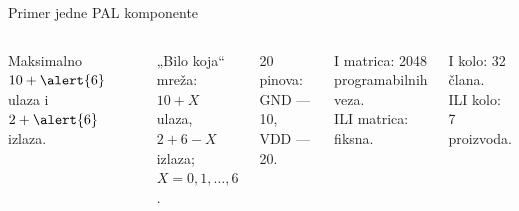 \begin{frame}[label=07-s007]{Primer jedne PAL komponente}
\begin{columns}[c,onlytextwidth]
\centering
{}\fontsize{10}{11}\selectfont
Maksimalno $10+\alert{6}$ ulaza i $2+\alert{6}$ izlaza.\par\vspace{2mm}
„Bilo koja“ mreža:\\$10+X$ ulaza,\\$2+6-X$ izlaza;\\$X=0,1,\ldots,6$.\par\vspace{2mm}
20 pinova:\\GND — 10, VDD — 20.\par\vspace{2mm}
I matrica: 2048 programabilnih veza.\\ILI matrica: fiksna.\par\vspace{2mm}
I kolo: 32 člana.\\ILI kolo: 7 proizvoda.
\end{columns}
\end{frame}
